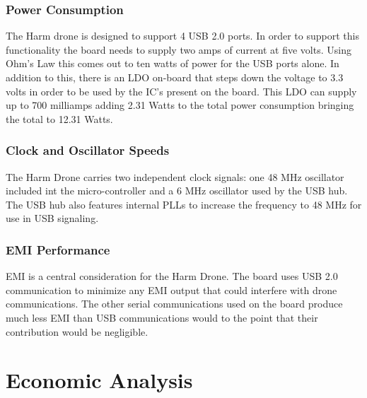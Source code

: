 \documentclass[12pt]{article}
\begin{document}
\subsubsection{Power Consumption}
The Harm drone is designed to support 4 USB 2.0 ports. In order to support this functionality the board needs to supply two amps of current at five volts. Using Ohm's Law this comes out to ten watts of power for the USB ports alone. In addition to this, there is an LDO on-board that steps down the voltage to 3.3 volts in order to be used by the IC's present on the board. This LDO can supply up to 700 milliamps adding 2.31 Watts to the total power consumption bringing the total to 12.31 Watts.
\subsubsection{Clock and Oscillator Speeds}
The Harm Drone carries two independent clock signals: one 48 MHz oscillator included int the micro-controller and a 6 MHz oscillator used by the USB hub. The USB hub also features internal PLLs to increase the frequency to 48 MHz for use in USB signaling.
\subsubsection{EMI Performance}
EMI is a central consideration for the Harm Drone. The board uses USB 2.0 communication to minimize any EMI output that could interfere with drone communications. The other serial communications used on the board produce much less EMI than USB communications would to the point that their contribution would be negligible.

\section{Economic Analysis}
\end{document}
